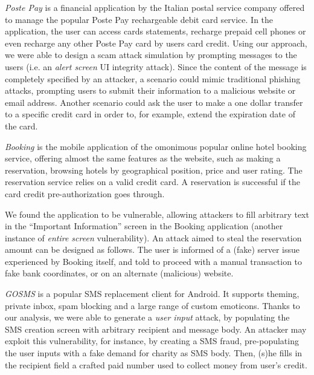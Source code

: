 \textit{Poste Pay} is a financial application by the Italian postal service company offered to manage the popular Poste Pay rechargeable debit card service. In the application, the user can access cards statements, recharge prepaid cell phones or even recharge any other Poste Pay card by users card credit. Using our approach, we were able to design a scam attack simulation by prompting messages to the users (i.e. an \emph{alert screen} UI integrity attack). Since the content of the message is completely specified by an attacker, a scenario could mimic traditional phishing attacks, prompting users to submit their information to a malicious website or email address. Another scenario could ask the user to make a one dollar transfer to a specific credit card in order to, for example, extend the expiration date of the card.

\textit{Booking} is the mobile application of the omonimous popular online hotel booking service, offering almost the same features as the website, such as
making a reservation, browsing hotels by geographical position, price and user rating. The reservation service relies on a valid credit card. A reservation is successful if the card credit pre-authorization goes through.

We found the application to be vulnerable, allowing attackers to fill arbitrary text in the ``Important Information'' screen in the Booking application (another instance of \emph{entire screen} vulnerability). An attack aimed to steal the reservation amount can be designed as follows. The user is informed of a (fake) server issue experienced by Booking itself, and told to proceed with a manual transaction to fake bank coordinates, or on an alternate (malicious) website.

\textit{GOSMS} is a popular SMS replacement client for Android. It supports theming, private inbox, spam blocking and a large range of custom emoticons. Thanks to our analysis, we were able to generate a \emph{user input} attack, by populating the SMS creation screen with arbitrary recipient and message body. An attacker may exploit this vulnerability, for instance, by creating a SMS fraud, pre-populating the user inputs with a fake demand for charity as SMS body. Then, (s)he fills in the recipient field a crafted paid number used to collect money from user's credit.


